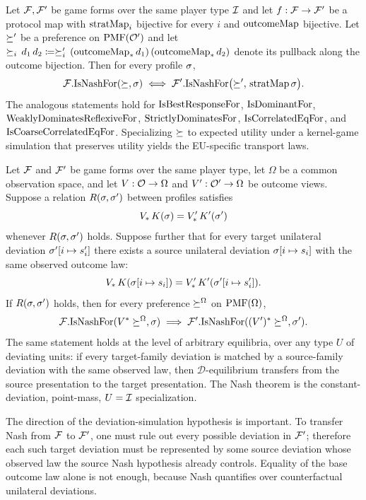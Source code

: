 \begin{theorem}
\label{thm:transport}
Let $\mathcal{F}, \mathcal{F}'$ be game forms over the same player type
$\mathcal{I}$ and let $f : \mathcal{F} \to \mathcal{F}'$ be a protocol map with
$\mathrm{stratMap}_i$ bijective for every $i$ and $\mathrm{outcomeMap}$ bijective.
Let $\succeq'$ be a preference on $\mathrm{PMF}(\mathcal{O}')$ and let
$\succeq_i\,d_1\,d_2 \coloneqq \succeq'_i\,(\mathrm{outcomeMap}_*\,d_1)\,(\mathrm{outcomeMap}_*\,d_2)$
denote its pullback along the outcome bijection.  Then for every
profile $\sigma$,
\[
  \mathcal{F}.\mathrm{IsNashFor}(\succeq, \sigma)
\;\Longleftrightarrow\;
\mathcal{F}'.\mathrm{IsNashFor}\bigl(\succeq',\,\mathrm{stratMap}\,\sigma\bigr).
\]
The analogous statements hold for $\mathrm{IsBestResponseFor}$, $\mathrm{IsDominantFor}$,
$\mathrm{WeaklyDominatesReflexiveFor}$, $\mathrm{StrictlyDominatesFor}$, $\mathrm{IsCorrelatedEqFor}$, and
$\mathrm{IsCoarseCorrelatedEqFor}$.  Specializing $\succeq$ to expected
utility under a kernel-game simulation that preserves utility
yields the EU-specific transport laws.
\end{theorem}

\begin{theorem}
\label{thm:observed-deviation-transport}
Let $\mathcal{F}$ and $\mathcal{F}'$ be game forms over the same player type, let
$\Omega$ be a common observation space, and let
$V : \mathcal{O} \to \Omega$ and $V' : \mathcal{O}' \to \Omega$ be
outcome views.  Suppose a relation $R(\sigma,\sigma')$ between
profiles satisfies
\[
  V_*\,K(\sigma) = V'_*\,K'(\sigma')
\]
whenever $R(\sigma,\sigma')$ holds.  Suppose further that for
every target unilateral deviation $\sigma'[i \mapsto s'_i]$
there exists a source unilateral deviation
$\sigma[i \mapsto s_i]$ with the same observed outcome law:
\[
  V_*\,K(\sigma[i \mapsto s_i])
  =
  V'_*\,K'(\sigma'[i \mapsto s'_i]).
\]
If $R(\sigma,\sigma')$ holds, then for every preference
$\succeq^\Omega$ on $\mathrm{PMF}(\Omega)$,
\[
  \mathcal{F}.\mathrm{IsNashFor}(V^*\succeq^\Omega,\sigma)
  \;\Longrightarrow\;
  \mathcal{F}'.\mathrm{IsNashFor}((V')^*\succeq^\Omega,\sigma').
\]
The same statement holds at the level of arbitrary
 equilibria, over any type $U$ of deviating units:
if every target-family deviation is matched by a source-family
deviation with the same observed law, then $\mathcal{D}$-equilibrium
transfers from the source presentation to the target presentation.  The
Nash theorem is the constant-deviation, point-mass, $U=\mathcal{I}$
specialization.
\end{theorem}

\noindent
The direction of the deviation-simulation hypothesis is important.
To transfer Nash from $\mathcal{F}$ to $\mathcal{F}'$, one must rule out every
possible deviation in $\mathcal{F}'$; therefore each such target deviation
must be represented by some source deviation whose observed law the
source Nash hypothesis already controls.  Equality of the base
outcome law alone is not enough, because Nash quantifies over
counterfactual unilateral deviations.

